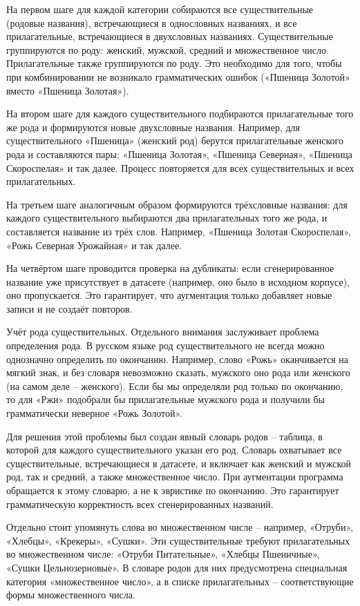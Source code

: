 На первом шаге для каждой категории собираются все существительные (родовые названия), встречающиеся в однословных названиях, и все прилагательные, встречающиеся в двухсловных названиях. Существительные группируются по роду: женский, мужской, средний и множественное число. Прилагательные также группируются по роду. Это необходимо для того, чтобы при комбинировании не возникало грамматических ошибок («Пшеница Золотой» вместо «Пшеница Золотая»).

На втором шаге для каждого существительного подбираются прилагательные того же рода и формируются новые двухсловные названия. Например, для существительного «Пшеница» (женский род) берутся прилагательные женского рода и составляются пары: «Пшеница Золотая», «Пшеница Северная», «Пшеница Скороспелая» и так далее. Процесс повторяется для всех существительных и всех прилагательных.

На третьем шаге аналогичным образом формируются трёхсловные названия: для каждого существительного выбираются два прилагательных того же рода, и составляется название из трёх слов. Например, «Пшеница Золотая Скороспелая», «Рожь Северная Урожайная» и так далее.

На четвёртом шаге проводится проверка на дубликаты: если сгенерированное название уже присутствует в датасете (например, оно было в исходном корпусе), оно пропускается. Это гарантирует, что аугментация только добавляет новые записи и не создаёт повторов.

Учёт рода существительных. Отдельного внимания заслуживает проблема определения рода. В русском языке род существительного не всегда можно однозначно определить по окончанию. Например, слово «Рожь» оканчивается на мягкий знак, и без словаря невозможно сказать, мужского оно рода или женского (на самом деле -- женского). Если бы мы определяли род только по окончанию, то для «Ржи» подобрали бы прилагательные мужского рода и получили бы грамматически неверное «Рожь Золотой».

Для решения этой проблемы был создан явный словарь родов -- таблица, в которой для каждого существительного указан его род. Словарь охватывает все существительные, встречающиеся в датасете, и включает как женский и мужской род, так и средний, а также множественное число. При аугментации программа обращается к этому словарю, а не к эвристике по окончанию. Это гарантирует грамматическую корректность всех сгенерированных названий.

Отдельно стоит упомянуть слова во множественном числе -- например, «Отруби», «Хлебцы», «Крекеры», «Сушки». Эти существительные требуют прилагательных во множественном числе: «Отруби Питательные», «Хлебцы Пшеничные», «Сушки Цельнозерновые». В словаре родов для них предусмотрена специальная категория «множественное число», а в списке прилагательных -- соответствующие формы множественного числа.

